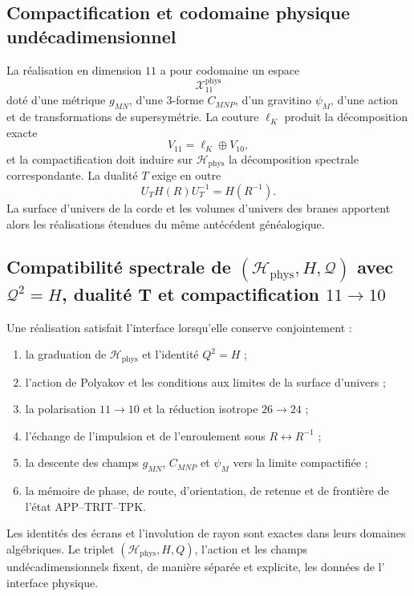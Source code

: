 \subsection{Compactification et codomaine physique undécadimensionnel}

La réalisation en dimension \(11\) a pour codomaine un espace
\[
 \mathcal X_{11}^{\mathrm{phys}}
\]
doté d'une métrique \(g_{MN}\), d'une \(3\)-forme \(C_{MNP}\), d'un gravitino
\(\psi_M\), d'une action et de transformations de supersymétrie. La couture
\(\ell_K\) produit la décomposition exacte
\[
 V_{11}=\ell_K\oplus V_{10},
\]
et la compactification doit induire sur
\(\mathcal H_{\mathrm{phys}}\) la décomposition spectrale correspondante.
La dualité \(T\) exige en outre
\[
 U_T H(R)U_T^{-1}=H(R^{-1}).
\]
La surface d'univers de la corde et les volumes d'univers des branes
apportent alors les réalisations étendues du même antécédent
généalogique.

\subsection{Compatibilité spectrale de \((\mathcal H_{\mathrm{phys}},H,\mathcal Q)\) avec \(\mathcal Q^2=H\), dualité T et compactification \(11\to10\)}

Une réalisation satisfait l'interface lorsqu'elle conserve conjointement :
\begin{enumerate}
\item la graduation de \(\mathcal H_{\mathrm{phys}}\) et l'identité
      \(Q^2=H\) ;
\item l'action de Polyakov et les conditions aux limites de la surface
      d'univers ;
\item la polarisation \(11\to10\) et la réduction isotrope \(26\to24\) ;
\item l'échange de l'impulsion et de l'enroulement sous \(R\leftrightarrow
      R^{-1}\) ;
\item la descente des champs \(g_{MN}\), \(C_{MNP}\) et \(\psi_M\) vers la
      limite compactifiée ;
\item la mémoire de phase, de route, d'orientation, de retenue et de frontière de l'état
      APP--TRIT--TPK.
\end{enumerate}
Les identités des écrans et l'involution de rayon sont exactes dans leurs
domaines algébriques. Le triplet
\((\mathcal H_{\mathrm{phys}},H,Q)\), l'action et les champs
undécadimensionnels fixent, de manière séparée et explicite, les données de l'
interface physique.
